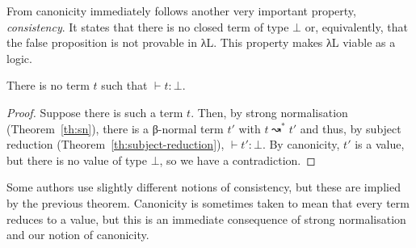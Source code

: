 \documentclass{article}
\theoremstyle{definition}
\begin{document}
From canonicity immediately follows another very important property, \emph{consistency}.
It states that there is no closed term of type $⊥$ or, equivalently, that the false proposition is not provable in λL.
This property makes λL viable as a logic.

\begin{theorem}[Consistency]
  There is no term $t$ such that $⊢ t : ⊥$.
\end{theorem}

\begin{proof}
  Suppose there is such a term $t$.
  Then, by strong normalisation (Theorem~\ref{th:sn}), there is a β-normal term $t'$ with $t ↝^{*} t'$ and thus, by subject reduction (Theorem~\ref{th:subject-reduction}), $⊢ t' : ⊥$.
  By canonicity, $t'$ is a value, but there is no value of type $⊥$, so we have a contradiction.
\end{proof}

Some authors use slightly different notions of consistency, but these are implied by the previous theorem.
Canonicity is sometimes taken to mean that every term reduces to a value, but this is an immediate consequence of strong normalisation and our notion of canonicity.
\end{document}

